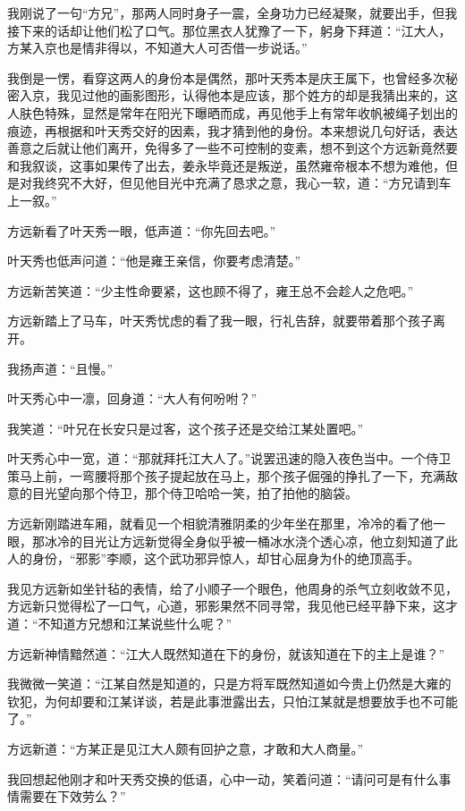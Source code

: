我刚说了一句“方兄”，那两人同时身子一震，全身功力已经凝聚，就要出手，但我接下来的话却让他们松了口气。那位黑衣人犹豫了一下，躬身下拜道：“江大人，方某入京也是情非得以，不知道大人可否借一步说话。”

我倒是一愣，看穿这两人的身份本是偶然，那叶天秀本是庆王属下，也曾经多次秘密入京，我见过他的画影图形，认得他本是应该，那个姓方的却是我猜出来的，这人肤色特殊，显然是常年在阳光下曝晒而成，再见他手上有常年收帆被绳子划出的痕迹，再根据和叶天秀交好的因素，我才猜到他的身份。本来想说几句好话，表达善意之后就让他们离开，免得多了一些不可控制的变素，想不到这个方远新竟然要和我叙谈，这事如果传了出去，姜永毕竟还是叛逆，虽然雍帝根本不想为难他，但是对我终究不大好，但见他目光中充满了恳求之意，我心一软，道：“方兄请到车上一叙。”

方远新看了叶天秀一眼，低声道：“你先回去吧。”

叶天秀也低声问道：“他是雍王亲信，你要考虑清楚。”

方远新苦笑道：“少主性命要紧，这也顾不得了，雍王总不会趁人之危吧。”

方远新踏上了马车，叶天秀忧虑的看了我一眼，行礼告辞，就要带着那个孩子离开。

我扬声道：“且慢。”

叶天秀心中一凛，回身道：“大人有何吩咐？”

我笑道：“叶兄在长安只是过客，这个孩子还是交给江某处置吧。”

叶天秀心中一宽，道：“那就拜托江大人了。”说罢迅速的隐入夜色当中。一个侍卫策马上前，一弯腰将那个孩子提起放在马上，那个孩子倔强的挣扎了一下，充满敌意的目光望向那个侍卫，那个侍卫哈哈一笑，拍了拍他的脑袋。

方远新刚踏进车厢，就看见一个相貌清雅阴柔的少年坐在那里，冷冷的看了他一眼，那冰冷的目光让方远新觉得全身似乎被一桶冰水浇个透心凉，他立刻知道了此人的身份，“邪影”李顺，这个武功邪异惊人，却甘心屈身为仆的绝顶高手。

我见方远新如坐针毡的表情，给了小顺子一个眼色，他周身的杀气立刻收敛不见，方远新只觉得松了一口气，心道，邪影果然不同寻常，我见他已经平静下来，这才道：“不知道方兄想和江某说些什么呢？”

方远新神情黯然道：“江大人既然知道在下的身份，就该知道在下的主上是谁？”

我微微一笑道：“江某自然是知道的，只是方将军既然知道如今贵上仍然是大雍的钦犯，为何却要和江某详谈，若是此事泄露出去，只怕江某就是想要放手也不可能了。”

方远新道：“方某正是见江大人颇有回护之意，才敢和大人商量。”

我回想起他刚才和叶天秀交换的低语，心中一动，笑着问道：“请问可是有什么事情需要在下效劳么？”

